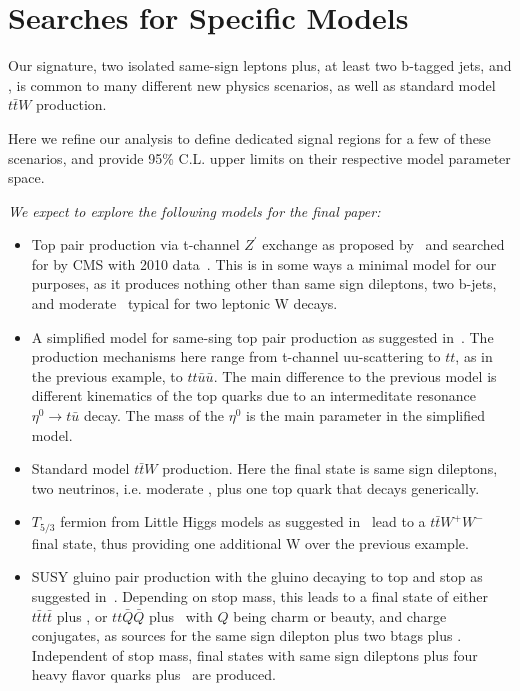 \section{Searches for Specific Models}
\label{sec:stampCollecting}

Our signature, two isolated same-sign leptons plus, at least two b-tagged jets, and \met, 
is common to many different new physics scenarios, as well as standard model $t\bar{t}W$ production.

Here we refine our analysis to define dedicated signal regions for a few of these scenarios,
and provide 95\% C.L. upper limits on their respective model parameter space.

{\it We expect to explore the following models for the final paper:}

\begin{itemize}
\item Top pair production via t-channel $Z^\prime$ exchange
as proposed by~\cite{berger} and searched for by CMS with 2010 data~\cite{sstop}. This is in some ways a minimal 
model for our purposes, as it produces nothing other than same sign dileptons, two b-jets, and moderate \met\ typical
for two leptonic W decays.
\item A simplified model for same-sing top pair production as suggested in~\cite{simplifiedModel}. 
The production mechanisms here range from t-channel uu-scattering to $tt$, as in the previous example, to
$tt\bar{u}\bar{u}$. The main difference to the previous model is different kinematics of the top quarks
due to an intermeditate resonance $\eta^0\to t \bar{u}$ decay. The mass of the $\eta^0$ is the main parameter
in the simplified model.
\item Standard model $t\bar{t}W$ production. Here the final state is same sign dileptons, two neutrinos, 
i.e. moderate \met, plus one top quark that decays generically.
\item $T_{5/3}$ fermion from Little Higgs models as suggested in~\cite{littlehiggs} lead to a $t\bar{t}W^+W^-$ final state, thus providing one additional W over the previous example.
\item SUSY gluino pair production with the gluino decaying to top and stop as suggested in~\cite{susyssbtags}\cite{susyssbtags2}. Depending on stop mass, this leads to a final state of either 
$t\bar{t}t\bar{t}$ plus \met , or $tt\bar{Q}\bar{Q}$ 
plus \met\ with $Q$ being charm or beauty, and charge conjugates, as sources for the same sign dilepton plus 
two btags plus \met. Independent of stop mass, final states with same sign dileptons plus four heavy flavor quarks
plus \met\ are produced.
\end{itemize}

